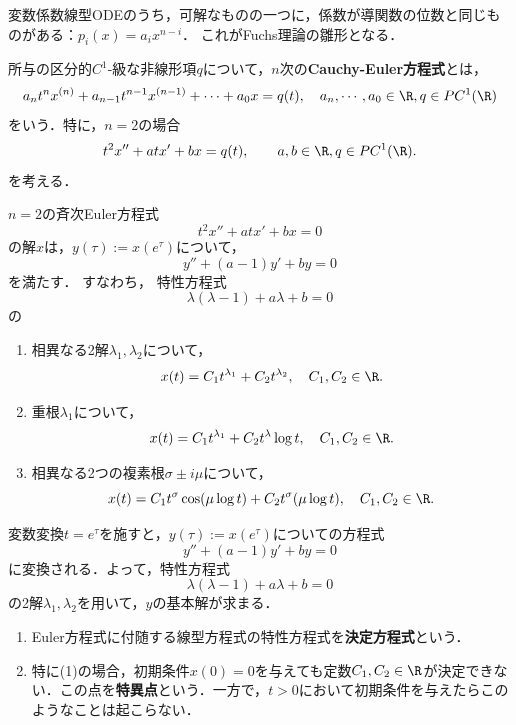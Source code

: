 \documentclass[uplatex,dvipdfmx]{jsreport}
\begin{document}
\begin{tcolorbox}[colframe=ForestGreen, colback=ForestGreen!10!white,breakable,colbacktitle=ForestGreen!40!white,coltitle=black,fonttitle=\bfseries\sffamily,
title=]
    変数係数線型ODEのうち，可解なものの一つに，係数が導関数の位数と同じものがある：$p_i(x)=a_ix^{n-i}$．
    これがFuchs理論の雛形となる．
\end{tcolorbox}

\begin{problem}
    所与の区分的$C^1$-級な非線形項$q$について，$n$次の\textbf{Cauchy-Euler方程式}とは，
    \[a_nt^nx^{(n)}+a_{n-1}t^{n-1}x^{(n-1)}+\cdots+a_0x=q(t),\quad a_n,\cdots,a_0\in\R,q\in PC^1(\R)\]
    をいう．特に，$n=2$の場合
    \[t^2x''+atx'+bx=q(t),\qquad a,b\in\R,q\in PC^1(\R).\]
    を考える．
\end{problem}

\begin{proposition}
    $n=2$の斉次Euler方程式
    \[t^2x''+atx'+bx=0\]
    の解$x$は，$y(\tau):=x(e^\tau)$について，
    \[y''+(a-1)y'+by=0\]
    を満たす．
    すなわち，
    特性方程式
    \[\lambda(\lambda-1)+a\lambda+b=0\]
    の
    \begin{enumerate}
        \item 相異なる2解$\lambda_1,\lambda_2$について，
        \[x(t)=C_1t^{\lambda_1}+C_2t^{\lambda_2},\quad C_1,C_2\in\R.\]
        \item 重根$\lambda_1$について，
        \[x(t)=C_1t^{\lambda_1}+C_2t^\lambda\log t,\quad C_1,C_2\in\R.\]
        \item 相異なる2つの複素根$\sigma\pm i\mu$について，
        \[x(t)=C_1t^\sigma\cos(\mu\log t)+C_2t^\sigma(\mu\log t),\quad C_1,C_2\in\R.\]
    \end{enumerate}
\end{proposition}
\begin{Proof}
    変数変換$t=e^\tau$を施すと，$y(\tau):=x(e^\tau)$についての方程式
    \[y''+(a-1)y'+by=0\]
    に変換される．よって，特性方程式
    \[\lambda(\lambda-1)+a\lambda+b=0\]
    の2解$\lambda_1,\lambda_2$を用いて，$y$の基本解が求まる．
\end{Proof}

\begin{definition}\mbox{}
    \begin{enumerate}
        \item Euler方程式に付随する線型方程式の特性方程式を\textbf{決定方程式}という．
        \item 特に(1)の場合，初期条件$x(0)=0$を与えても定数$C_1,C_2\in\R$が決定できない．この点を\textbf{特異点}という．一方で，$t>0$において初期条件を与えたらこのようなことは起こらない．
    \end{enumerate}
\end{definition}
\end{document}
